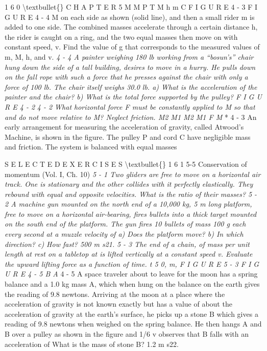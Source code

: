 \documentclass[10pt,oneside]{article}
\begin{document}
1 6 0 \textbackslash{}textbullet\{\} C H A P T E R  5 M M P T M h m C F I G U R E  4 - 3 F I G U R E  4 - 4 M on each side as shown (solid line), and then a small rider m is added to one side. The combined masses accelerate through a certain distance h, the rider is caught on a ring, and the two equal masses then move on with constant speed, v. Find the value of g that corresponds to the measured values of m, M, h, and v. \emph{ } \emph{ 4 - 4 A painter weighing 180 lb working from a “bosun’s” chair hung down the side of a tall building, desires to move in a hurry. He pulls down on the fall rope with such a force that he presses against the chair with only a force of 100 lb. The chair itself weighs 30.0 lb. a) What is the acceleration of the painter and the chair? b) What is the total force supported by the pulley? F I G U R E  4 - 2 } \emph{ 4 - 2 What horizontal force F must be constantly applied to M so that and do not move relative to M? Neglect friction. M2 M1 M2 M1 F M } * 4 - 3 An early arrangement for measuring the acceleration of gravity, called Atwood’s Machine, is shown in the figure. The pulley P and cord C have negligible mass and friction. The system is balanced with equal masses\par

S E L E C T E D  E X E R C I S E S \textbackslash{}textbullet\{\} 1 6 1 5-5 Conservation of momentum (Vol. I, Ch. 10) \emph{ 5 - 1 Two gliders are free to move on a horizontal air track. One is stationary and the other collides with it perfectly elastically. They rebound with equal and opposite velocities. What is the ratio of their masses? } \emph{ 5 - 2 A machine gun mounted on the north end of a 10,000 kg, 5 m long platform, free to move on a horizontal air-bearing, fires bullets into a thick target mounted on the south end of the platform. The gun fires 10 bullets of mass 100 g each every second at a muzzle velocity of a) Does the platform move? b) In which direction? c) How fast? 500 m s21. } \emph{ 5 - 3 The end of a chain, of mass per unit length at rest on a tabletop at is lifted vertically at a constant speed v. Evaluate the upward lifting force as a function of time. t 5 0, m, F I G U R E  5 - 3 F I G U R E  4 - 5 B A } \emph{ } 4 - 5 A space traveler about to leave for the moon has a spring balance and a 1.0 kg mass A, which when hung on the balance on the earth gives the reading of 9.8 newtons. Arriving at the moon at a place where the acceleration of gravity is not known exactly but has a value of about the acceleration of gravity at the earth’s surface, he picks up a stone B which gives a reading of 9.8 newtons when weighed on the spring balance. He then hangs A and B over a pulley as shown in the figure and 1/6 v observes that B falls with an acceleration of What is the mass of stone B? 1.2 m s22.\par
\end{document}

